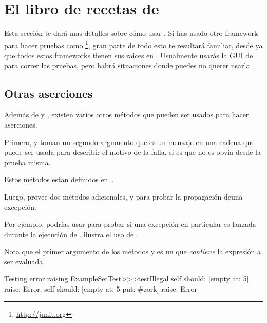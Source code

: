 \documentclass[a4paper,10pt,twoside]{book}
\begin{document}

\section{El libro de recetas de \SUnit }

Esta sección te dará mas detalles sobre cómo usar \SUnit.  Si has usado
otro framework para hacer pruebas como \Junit\footnote{\url{http://junit.org}},
gran parte de todo esto te resultar\'a familiar, desde ya que todos estos frameworks tienen
sus raices en \SUnit.
Usualmente usar\'as la GUI de \SUnit para correr las pruebas, pero 
habr\'a situaciones donde puedes no querer usarla.


\subsection{Otras aserciones}
Adem\'as de  y , existen varios otros m\'etodos que pueden
ser usados para hacer aserciones.

Primero,  y  toman un segundo
argumento que es un mensaje en una cadena que puede ser usada para describir el motivo de la falla,
si es que no es obvia desde la prueba misma.

Estos m\'etodos estan definidos en~.

Luego, \sunit provee dos m\'etodos adicionales,  y 
para probar la propagaci\'on deuna excepci\'on. 

Por ejemplo, podr\'ias usar 
para probar si una excepci\'on en particular es lanzada durante la
ejecuci\'on de .  ilustra el uso de \mbox{.}



Nota que el primer argumento de los m\'etodos  y  es un
 que \emph{contiene} la expresi\'on a ser evaluada.

\begin{method}[ESTtestIllegal]{Testing error raising}
ExampleSetTest>>>testIllegal
	self should: [empty at: 5] raise: Error.
	self should: [empty at: 5 put: #zork] raise: Error
\end{method}
\end{document}
